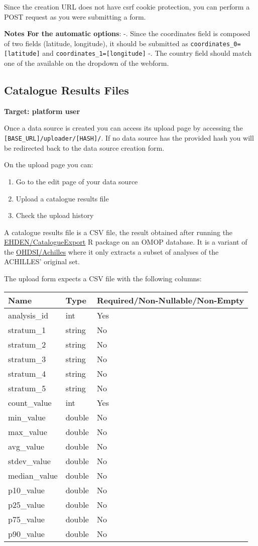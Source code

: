 \documentclass[
]{book}
\providecommand{\tightlist}{%
  \setlength{\itemsep}{0pt}\setlength{\parskip}{0pt}}
\begin{document}
Since the creation URL does not have csrf cookie protection, you can perform a POST request as you were submitting a form.

\textbf{Notes For the automatic options}:
-. Since the coordinates field is composed of two fields (latitude, longitude), it should be submitted as \texttt{coordinates\_0={[}latitude{]}} and \texttt{coordinates\_1={[}longitude{]}}
-. The country field should match one of the available on the dropdown of the webform.

\hypertarget{catalogue-results-files}{%
\subsection*{Catalogue Results Files}\label{catalogue-results-files}}

\textbf{Target: platform user}

Once a data source is created you can access its upload page by accessing the \texttt{{[}BASE\_URL{]}/uploader/{[}HASH{]}/}. If no data source has the provided hash you will be redirected back to the data source creation form.

On the upload page you can:

\begin{enumerate}
\def\labelenumi{\arabic{enumi}.}
\tightlist
\item
  Go to the edit page of your data source
\item
  Upload a catalogue results file
\item
  Check the upload history
\end{enumerate}

A catalogue results file is a CSV file, the result obtained after running the \href{https://github.com/EHDEN/CatalogueExport}{EHDEN/CatalogueExport} R package on an OMOP database. It is a variant of the \href{https://github.com/OHDSI/Achilles}{OHDSI/Achilles} where it only extracts a subset of analyses of the ACHILLES' original set.

The upload form expects a CSV file with the following columns:

\begin{longtable}[]{@{}lll@{}}
\toprule
Name & Type & Required/Non-Nullable/Non-Empty\tabularnewline
\midrule
\endhead
analysis\_id & int & Yes\tabularnewline
stratum\_1 & string & No\tabularnewline
stratum\_2 & string & No\tabularnewline
stratum\_3 & string & No\tabularnewline
stratum\_4 & string & No\tabularnewline
stratum\_5 & string & No\tabularnewline
count\_value & int & Yes\tabularnewline
min\_value & double & No\tabularnewline
max\_value & double & No\tabularnewline
avg\_value & double & No\tabularnewline
stdev\_value & double & No\tabularnewline
median\_value & double & No\tabularnewline
p10\_value & double & No\tabularnewline
p25\_value & double & No\tabularnewline
p75\_value & double & No\tabularnewline
p90\_value & double & No\tabularnewline
\bottomrule
\end{longtable}
\end{document}
